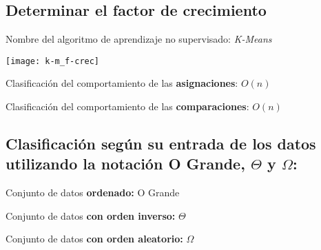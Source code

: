 \documentclass{article}
\begin{document}
\subsection{Determinar el factor de crecimiento}
Nombre del algoritmo de aprendizaje no supervisado: \textit{K-Means}

\begin{center}
  \texttt{[image: k-m\_f-crec]}
\end{center}

Clasificación del comportamiento de las \textbf{asignaciones}: \(O(n)\)

Clasificación del comportamiento de las \textbf{comparaciones}: \(O(n)\)

\subsection{Clasificación según su entrada de los datos utilizando la notación O Grande, \(\Theta\) y \(\Omega\):}

Conjunto de datos \textbf{ordenado:} O Grande

Conjunto de datos \textbf{con orden inverso:} \(\Theta\)

Conjunto de datos \textbf{con orden aleatorio:} \(\Omega\)

\newpage
\end{document}
